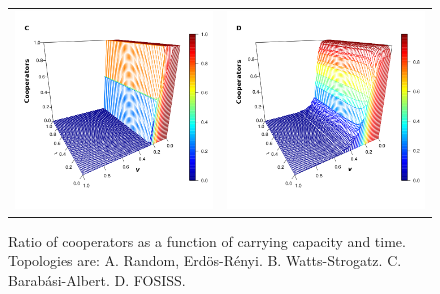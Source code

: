 \documentclass[11pt]{article}
\begin{document}
\begin{figure} [h!]
\begin{tabular}{cc}
  \\
  \includegraphics[scale=0.28]{images/barabasi_dc_nus_1.png} & \includegraphics[scale=0.28]{images/fosiss_dc_nus_1.png}
\end{tabular}
\caption{Ratio of cooperators as a function of carrying capacity and time. Topologies are: A. Random, Erd\"{o}s-R\'enyi. B. Watts-Strogatz. C. Barab\'asi-Albert. D. FOSISS.
}\label{CD}
\end{figure}
\end{document}
